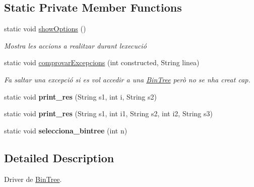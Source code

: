 \subsection*{Static Private Member Functions}
\begin{DoxyCompactItemize}
\item 
\mbox{\label{classdomini_1_1utils_1_1Driver____BinTree_aadd7535430d353033b6f35b6d466e018}} 
static void \hyperlink{classdomini_1_1utils_1_1Driver____BinTree_aadd7535430d353033b6f35b6d466e018}{show\+Options} ()
\begin{DoxyCompactList}\small\item\em Mostra les accions a realitzar durant l\textquotesingle{}execució \end{DoxyCompactList}\item 
static void \hyperlink{classdomini_1_1utils_1_1Driver____BinTree_a06b6edeb965f3677c7ebb085d512f568}{comprovar\+Excepcions} (int constructed, String linea)
\begin{DoxyCompactList}\small\item\em Fa saltar una excepció si es vol accedir a una \hyperlink{classdomini_1_1utils_1_1BinTree}{Bin\+Tree} però no se n\textquotesingle{}ha creat cap. \end{DoxyCompactList}\item 
\mbox{\label{classdomini_1_1utils_1_1Driver____BinTree_a434e26afb3eb701558d81b0fd1c29dcb}} 
static void {\bfseries print\+\_\+res} (String s1, int i, String s2)
\item 
\mbox{\label{classdomini_1_1utils_1_1Driver____BinTree_a2d59fc46084a11fab2c22ce35c693f60}} 
static void {\bfseries print\+\_\+res} (String s1, int i1, String s2, int i2, String s3)
\item 
\mbox{\label{classdomini_1_1utils_1_1Driver____BinTree_a0d90bf2cb928174547e712140b5a4fe5}} 
static void {\bfseries selecciona\+\_\+bintree} (int n)
\end{DoxyCompactItemize}


\subsection{Detailed Description}
Driver de \hyperlink{classdomini_1_1utils_1_1BinTree}{Bin\+Tree}. 


